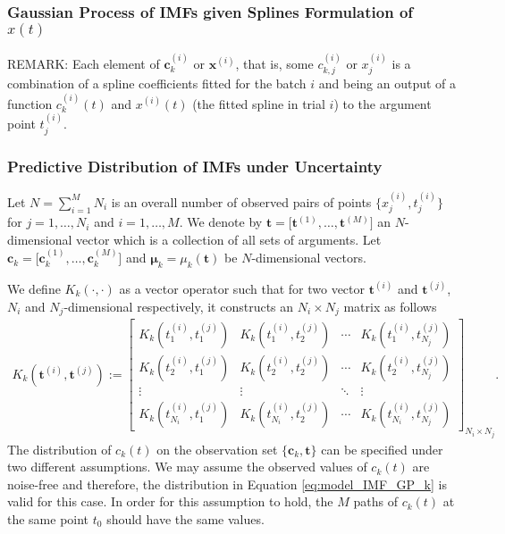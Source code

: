 \subsubsection{Gaussian Process of IMFs given Splines Formulation of $x(t)$}

{\color{red}
REMARK: Each element of $\mathbf{c}_k^{(i)}$ or $\mathbf{x}^{(i)}$, that is, some $c_{k,j}^{(i)}$ or $x_{j}^{(i)}$ is a combination of a spline coefficients fitted for the batch $i$ and being an output of a function $c_k^{(i)}(t)$ and $x^{(i)}(t)$ (the fitted spline in trial $i$) to the argument point $t^{(i)}_j$.
}

\subsubsection{Predictive Distribution of IMFs  under Uncertainty}
Let $N = \sum_{i=1}^M N_i$ is an overall number of  observed pairs of points $\big\{x_j^{(i)}, t^{(i)}_j \big\}$  for $j = 1,\dots,N_i$ and $i = 1,\ldots	, M$. We denote by $\mathbf{t} = \big[ \mathbf{t}^{(1)} ,\ldots,\mathbf{t}^{(M)} \big]$ an $N$-dimensional vector which is a collection of all sets of arguments. Let $\mathbf{c}_k  = \big[ \mathbf{c}_k^{(1)} ,\ldots,\mathbf{c}_k^{(M)} \big]$ and $\bm{\mu}_k = \mu_k(\mathbf{t})$  be  $N$-dimensional vectors. 

We define $K_k( \cdot, \cdot)$ as a vector operator such that for two vector $\mathbf{t}^{(i)}$ and $\mathbf{t}^{(j)}$,  $N_i$ and $N_j$-dimensional respectively, it constructs an $N_i\times N_j$ matrix as follows
\begin{align*}
K_k (\mathbf{t}^{(i)},\mathbf{t}^{(j)}  ) := \begin{bmatrix}
K_k(t_1^{(i)},t_1^{(j)}) & K_k(t_1^{(i)},t_2^{(j)})& \cdots & K_k(t_1^{(i)},t_{N_j}^{(j)}) \\
K_k(t_2^{(i)},t_1^{(j)}) & K_k(t_2^{(i)},t_2^{(j)})& \cdots & K_k(t_2^{(i)},t_{N_j}^{(j)}) \\
\vdots & \vdots & \ddots & \vdots  \\
K_k(t_{N_i}^{(i)},t_1^{(j)}) & K_k(t_{N_i}^{(i)},t_2^{(j)})& \cdots & K_k(t_{N_i}^{(i)},t_{N_j}^{(j)}) 
\end{bmatrix}_{ N_i \times	N_j}. 
\end{align*}
The distribution of $c_k(t)$ on the observation set $\big\{ \mathbf{c}_k, \mathbf{t} \big\}$ can be specified under two different assumptions.  We may assume  the observed values of $c_k(t)$ are noise-free and therefore, the distribution in Equation \eqref{eq:model_IMF_GP_k} is valid for this case. In order for this assumption to hold, the $M$ paths of $c_k(t)$ at the same point $t_0$ should have the same values. 

